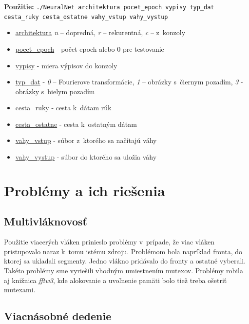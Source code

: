 \textbf{Použitie:} {\tt ./NeuralNet architektura pocet\_epoch vypisy typ\_dat cesta\_ruky cesta\_ostatne vahy\_vstup vahy\_vystup}
\begin{itemize}
\item \underline{architektura} \textit{n} -- dopredná, \textit{r} -- rekurentná, \textit{c} -- z~konzoly
\item \underline{pocet\_epoch} - počet epoch alebo 0 pre testovanie
\item \underline{vypisy} - miera výpisov do konzoly
\item \underline{typ\_dat} - \textit{0} -- Fourierove transformácie, \textit{1} -- obrázky s~čiernym pozadím, \textit{3} - obrázky s~bielym pozadím
\item \underline{cesta\_ruky} - cesta k~dátam rúk
\item \underline{cesta\_ostatne} - cesta k~ostatným dátam
\item \underline{vahy\_vstup} - súbor z~ktorého sa načítajú váhy
\item \underline{vahy\_vystup} - súbor do ktorého sa uložia váhy
\end{itemize}


\section{Problémy a ich riešenia}

\subsection{Multivláknovosť}

Použitie viacerých vláken prinieslo problémy v~prípade, že viac vláken pristupovalo naraz k~tomu istému zdroju. Problémom bola napríklad fronta, do ktorej sa ukladali segmenty. Jedno vlákno pridávalo do fronty a ostatné vyberali. Takéto problémy sme vyriešili vhodným umiestnením mutexov. Problémy robila aj knižnica \textit{fftw3}, kde alokovanie a uvoľnenie pamäti bolo tiež treba ošetriť mutexami.

\subsection{Viacnásobné dedenie}

